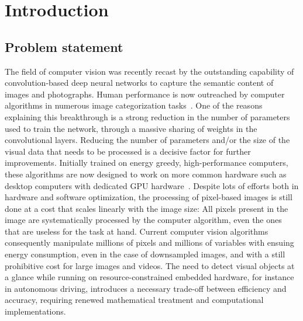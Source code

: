 \section{Introduction}
\label{sec:intro}
\subsection{Problem statement}
The field of computer vision was recently recast by the outstanding capability of convolution-based deep neural networks to capture the semantic content of images and photographs. Human performance is now outreached by computer algorithms in numerous image categorization tasks~\cite{He15}. One of the reasons explaining this breakthrough is a strong reduction in the number of parameters used to train the network, through a massive sharing of weights in the convolutional layers. Reducing the number of parameters and/or the size of the visual data that needs to be processed is a decisive factor for further improvements. Initially trained on energy greedy, high-performance computers, these algorithms are now designed to work on more common hardware such as desktop computers with dedicated GPU hardware~\cite{Sandler18}. Despite lots of efforts both in hardware and software optimization, the processing of pixel-based images is still done at a cost that scales linearly with the image size: All pixels present in the image are systematically processed by the computer algorithm, even the ones that are useless for the task at hand. Current computer vision algorithms consequently manipulate millions of pixels and millions of variables with ensuing energy consumption, even in the case of downsampled images, and with a still prohibitive cost for large images and videos. The need to detect visual objects at a glance while running on resource-constrained embedded hardware, for instance in autonomous driving, introduces a necessary trade-off between efficiency and accuracy,
requiring renewed mathematical treatment and computational implementations.

